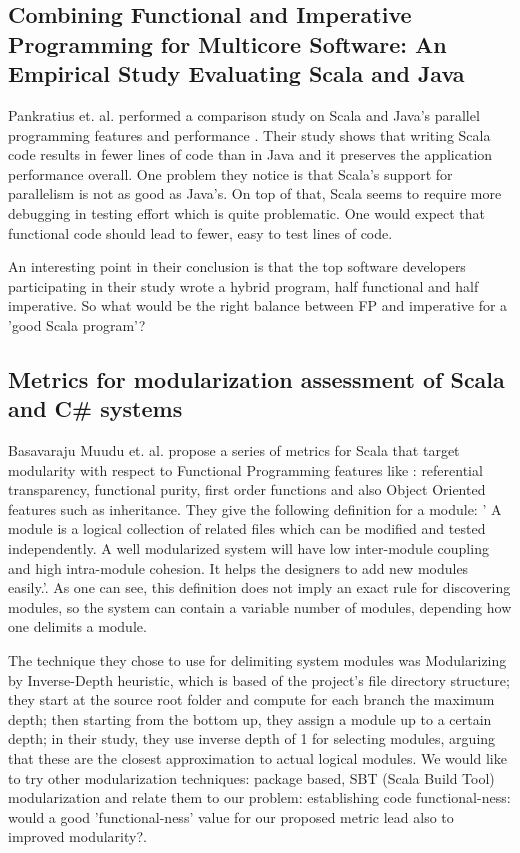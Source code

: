 \documentclass{article}
\begin{document}
\subsection {Combining Functional and Imperative Programming for Multicore Software: An Empirical Study Evaluating Scala and Java}
Pankratius et. al. performed a comparison study on Scala and Java's parallel programming features and performance \cite{Pankratius_combiningfunctional}. Their study shows that writing Scala code results in fewer lines of code than in Java and it preserves the application performance overall. One problem they notice is that Scala's support for parallelism is not as good as Java's. On top of that, Scala seems to require more debugging in testing effort which is quite problematic. One would expect that functional code should lead to fewer, easy to test lines of code. \par

An interesting point in their conclusion is that the top software developers participating in their study wrote a hybrid program, half functional and half imperative. So what would be the right balance between FP and imperative for a 'good Scala program'? \par

\subsection{ Metrics for modularization assessment of Scala and C{\#} systems }
Basavaraju Muudu et. al. \cite{DBLP:conf/icse/MudduABP13} propose a series of metrics for Scala that target modularity with respect to Functional Programming features like : referential transparency, functional purity, first order functions and also Object Oriented features such as inheritance. They give the following definition for a module: ' A module is a logical collection of related files which can be modified and tested independently. A well modularized system will have low inter-module coupling and high intra-module cohesion. It helps the designers to add new modules easily.'\cite{DBLP:conf/icse/MudduABP13}. As one can see, this definition does not imply an exact rule for discovering  modules, so the system can contain a variable number of modules, depending how one delimits a module. \par

The technique they chose to use for delimiting system modules  was Modularizing by  Inverse-Depth heuristic, which is based of the project's file directory structure; they start at the source root folder and compute for each branch the maximum depth; then starting from the bottom up, they assign a module up to a certain depth; in their study, they use inverse depth of 1 for selecting modules, arguing that these are the closest approximation to actual logical modules. We would like to try other modularization techniques: package based, SBT (Scala Build Tool)  modularization and relate them to our problem: establishing code functional-ness: would a good 'functional-ness' value for our proposed metric lead also to improved modularity?.\par
\end{document}
